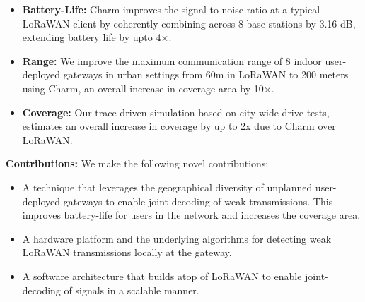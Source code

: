 \begin{itemize}
    \item {\bf Battery-Life: }Charm improves the signal to noise ratio at a typical LoRaWAN client by coherently combining across 8 base stations by 3.16 dB, extending battery life by upto 4$\times$.
    \item {\bf Range: } We improve the maximum communication range of 8 indoor user-deployed gateways in urban settings from 60m in LoRaWAN to 200 meters using Charm, an overall increase in coverage area by 10$\times$.
    \item {\bf Coverage: } Our trace-driven simulation based on city-wide drive tests, estimates an overall increase in coverage by up to 2x due to Charm over LoRaWAN. 
\end{itemize}


\noindent \textbf{Contributions:} We make the following novel contributions:
\begin{itemize}
    \item A technique that leverages the geographical diversity of unplanned user-deployed gateways to enable joint decoding of weak transmissions. This improves battery-life for users in the network and increases the coverage area.
    \item A hardware platform and the underlying algorithms for detecting weak LoRaWAN transmissions locally at the gateway. 
    \item A software architecture that builds atop of LoRaWAN to enable joint-decoding of signals in a scalable manner.
\end{itemize}


















